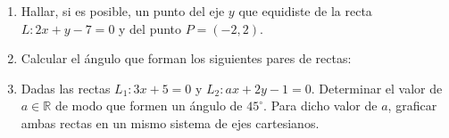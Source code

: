 \documentclass[11pt]{article}
\begin{document}
\begin{enumerate}[\hspace{-7mm}$1)$]
\item  Hallar, si es posible, un punto del eje $y$ que equidiste de la recta $L : 2x + y - 7 = 0$ y del punto $P = (-2,2)$.













\item  Calcular el ángulo que forman los siguientes pares de rectas:

\begin{enumerate}[(a) ]
\end{enumerate}



















\item Dadas las rectas $L_1 : 3x + 5 = 0$ y $L_2 : ax + 2y - 1 = 0$. Determinar el valor de $a \in \mathbb{R}$ de modo que formen un ángulo de $45^\circ$. Para dicho valor de $a$, graficar ambas rectas en un mismo sistema de ejes cartesianos.














\end{enumerate}
\end{document}
